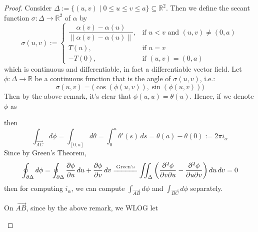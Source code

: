 \begin{proof}
Consider $\Delta := \{(u,v) \mid 0 \le u \le v \le a\} \subseteq \mathbb{R}^2$. Then we define the secant function $\sigma:\Delta \to \mathbb{R}^2$ of $\alpha$ by
\[
\sigma(u,v) := \begin{cases}
\dfrac{\alpha(v) - \alpha(u)}{\|\alpha(v) - \alpha(u)\|}, & \text{if } u < v \text{ and } (u,v) \neq (0,a) \\[10pt]
T(u), & \text{if } u = v \\[5pt]
-T(0), & \text{if } (u,v) = (0,a)
\end{cases}
\]
which is continuous and differentiable, in fact a differentiable vector field. Let $\phi:\Delta \to \mathbb{R}$ be a continuous function that is the angle of $\sigma(u,v)$, i.e.:
\[
\sigma(u,v) = \Big(\cos(\phi(u,v)), \sin(\phi(u,v))\Big)
\]
Then by the above remark, it's clear that $\phi(u,u) = \theta(u)$. Hence, if we denote $\phi$ as

\begin{center}
\end{center}

\noindent then
\[
\int_{\vec{AC}} d\phi = \int_{[0,a]} d\theta = \int_0^a \theta'(s)\,ds = \theta(a) - \theta(0) := 2\pi i_\alpha
\]
Since by Green's Theorem,
\[
\oint_{\partial\Delta} d\phi = \oint_{\partial\Delta} \frac{\partial \phi}{\partial u}\,du + \frac{\partial \phi}{\partial v}\,dv \xlongequal{\text{Green's}} \iint_{\Delta} \left( \frac{\partial^2 \phi}{\partial v \partial u} - \frac{\partial^2 \phi}{\partial u \partial v} \right) du\,dv = 0
\]
then for computing $i_\alpha$, we can compute $\int_{\vec{AB}} d\phi$ and $\int_{\vec{BC}} d\phi$ separately.

\noindent On $\vec{AB}$, since by the above remark, we WLOG let

\begin{center}
\end{center}
\end{proof}
